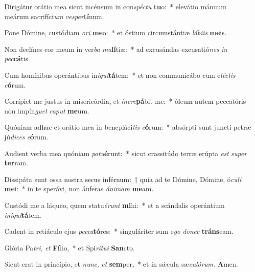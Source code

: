 \item Dirigátur orátio mea sicut incénsum in con\tinyhspace\textit{spéctu} \textbf{tu}o:~* elevátio mánuum meárum sacrifíci\tinyhspace\textit{um} \textit{vesper}\textbf{tí}num.
\item Pone Dómine, custódiam \textit{ori} \textbf{me}o:~* et óstium circumstántiæ \textit{lábiis} \textbf{me}is.
\item Non declínes cor meum in ver\textit{ba} \textit{ma}\textbf{lí}tiæ:~* ad excusándas excusatió\textit{nes} \textit{in} \textit{pec}\textbf{cá}tis.
\item Cum homínibus operántibus in\tinyhspace\textit{iqui}\textbf{tá}tem:~* et non communicábo cum e\tinyhspace\textit{léctis} \textit{e}\textbf{ó}rum.
\item Corrípiet me justus in misericórdia, et \textit{incre}\textbf{pá}bit me:~* óleum autem peccatóris non impín\textit{guet} \textit{caput} \textbf{me}um.
\item Quóniam adhuc et orátio mea in benepláci\textit{tis} \textit{e}\textbf{ó}rum:~* absórpti sunt juncti petræ jú\textit{dices} \textit{e}\textbf{ó}rum.
\item Audient verba mea quóniam \textit{potu}\textbf{é}runt:~* sicut crassitúdo terræ erúpta \textit{est} \textit{super} \textbf{ter}ram.
\item Dissipáta sunt ossa nostra secus inférnum:~† quia ad te Dómine, Dómine, ó\textit{culi} \textbf{me}i:~* in te sperávi, non áuferas \textit{ánimam} \textbf{me}am.
\item Custódi me a láqueo, quem statu\textit{érunt} \textbf{mi}hi:~* et a scándalis operántium \textit{iniqui}\textbf{tá}tem.
\item Cadent in retiáculo ejus \textit{pecca}\textbf{tó}res:~* singuláriter sum e\textit{go} \textit{donec} \textbf{tráns}eam.
\item Glória Pa\tinyhspace\textit{tri,} \textit{et} \textbf{Fí}lio,~* et Spi\tinyhspace\textit{rítui} \textbf{San}cto.
\item Sicut erat in princípio, et \textit{nunc,} \textit{et} \textbf{sem}per,~* et in sǽcula sæ\tinyhspace\textit{culórum.} \textbf{A}men.